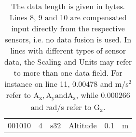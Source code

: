 \begin{table}[!b]
{\begin{minipage}{18cm}
\begin{tabular}{@{\makebox[3em][r]{\rownumber\space}}|llllll}
				001010               & 4                    & s32                 & Altitude                    & 0.1                & m                                                
			\end{tabular}
			\caption{The data length is given in bytes. Lines 8, 9 and 10 are compensated input directly from the respective sensors, i.e. no data fusion is used. 
				In lines with different types of sensor data, the Scaling and Units may refer to more than one data field.
				For instance on line 11, 0.00478 and $\si{\meter \per \second \squared}$ refer to $\mathrm{A_x, A_y and A_z}$, while 0.000266 and rad/s refer to $\mathrm{G_x}$.}
			\label{tab:OD}
		\end{minipage}
	}
	\end{table}